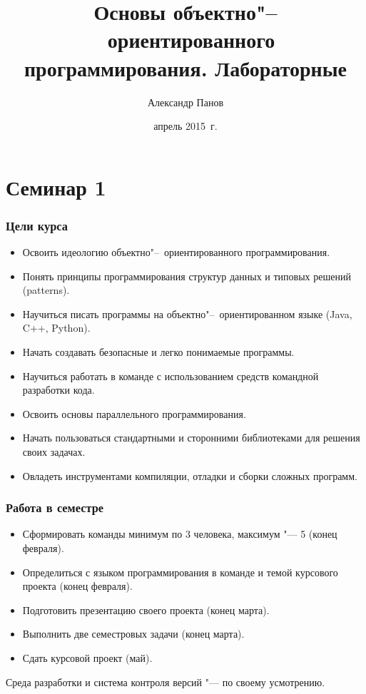 \documentclass[default]{beamer}
\begin{document}
	
	\title[ООП. Лабораторные]{Основы объектно"--~ориентированного программирования.
		Лабораторные}
	\author[Панов]{Александр Панов}
	\date{апрель 2015~г.} 
	
	\begin{frame}
		\titlepage
	\end{frame}
	
	\section {Семинар 1}
	
	\begin{frame}
		\frametitle{Цели курса}
		
		\begin{itemize}
			\item Освоить идеологию объектно"--~ориентированного программирования.
			\item Понять принципы программирования структур данных и типовых решений
			(patterns).
			\item Научиться писать программы на объектно"--~ориентированном языке (Java,
			C++, Python).
			\item Начать создавать безопасные и легко понимаемые программы.
			\item Научиться работать в команде с использованием средств командной
			разработки кода.
			\item Освоить основы параллельного программирования.
			\item Начать пользоваться стандартными и сторонними библиотеками для решения
			своих задачах.
			\item Овладеть инструментами компиляции, отладки и сборки сложных программ.
		\end{itemize}
	\end{frame}
	
	\begin{frame}
		\frametitle{Работа в семестре}
		
		\begin{itemize}
			\item Сформировать команды минимум по 3 человека, максимум "--- 5 (конец
			февраля).
			\item Определиться с языком программирования в команде и темой курсового
			проекта (конец февраля).
			\item Подготовить презентацию своего проекта (конец марта).
			\item Выполнить две семестровых задачи (конец марта).
			\item Сдать курсовой проект (май).
		\end{itemize}
		
		\par\bigskip
		Среда разработки и система контроля версий "--- по своему усмотрению.
	\end{frame}
	
\end{document}
